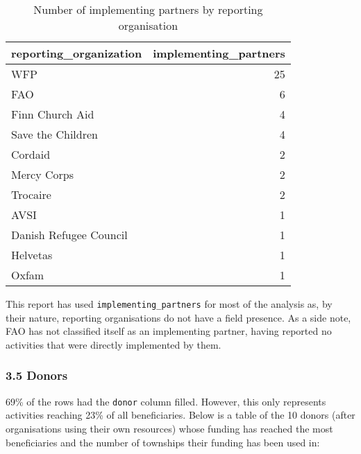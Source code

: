 \documentclass[
]{article}
\begin{document}
\begin{table}

\caption{\label{tab:table-reporting-organisation}Number of implementing partners by reporting organisation}
\begin{tabular}[t]{l|r}
\hline
reporting\_organization & implementing\_partners\\
\hline
WFP & 25\\
\hline
FAO & 6\\
\hline
Finn Church Aid & 4\\
\hline
Save the Children & 4\\
\hline
Cordaid & 2\\
\hline
Mercy Corps & 2\\
\hline
Trocaire & 2\\
\hline
AVSI & 1\\
\hline
Danish Refugee Council & 1\\
\hline
Helvetas & 1\\
\hline
Oxfam & 1\\
\hline
\end{tabular}
\end{table}

This report has used \texttt{implementing\_partners} for most of the
analysis as, by their nature, reporting organisations do not have a
field presence. As a side note, FAO has not classified itself as an
implementing partner, having reported no activities that were directly
implemented by them.

\hypertarget{donors}{%
\subsubsection{3.5 Donors}\label{donors}}

69\% of the rows had the \texttt{donor} column filled. However, this
only represents activities reaching 23\% of all beneficiaries. Below is
a table of the 10 donors (after organisations using their own resources)
whose funding has reached the most beneficiaries and the number of
townships their funding has been used in:
\end{document}
